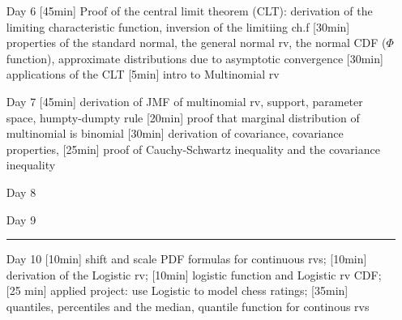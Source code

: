 \begin{enumerate}



\item[Day 6] [45min] Proof of the central limit theorem (CLT): derivation of the limiting characteristic function, inversion of the limitiing ch.f [30min] properties of the standard normal, the general normal rv, the normal CDF ($\Phi$ function), approximate distributions due to asymptotic convergence [30min] applications of the CLT [5min] intro to Multinomial rv

\item[Day 7] [45min] derivation of JMF of multinomial rv, support, parameter space, humpty-dumpty rule [20min] proof that marginal distribution of multinomial is binomial [30min] derivation of covariance, covariance properties, [25min] proof of Cauchy-Schwartz inequality and the covariance inequality



\item[Day 8] 
\item[Day 9] 

\rule{8cm}{0.4pt} 

\item[Day 10]  [10min] shift and scale PDF formulas for continuous rvs; [10min] derivation of the Logistic rv; [10min] logistic function and Logistic rv CDF; [25 min] applied project: use Logistic to model chess ratings; [35min] quantiles, percentiles and the median, quantile function for continous rvs



\end{enumerate}
